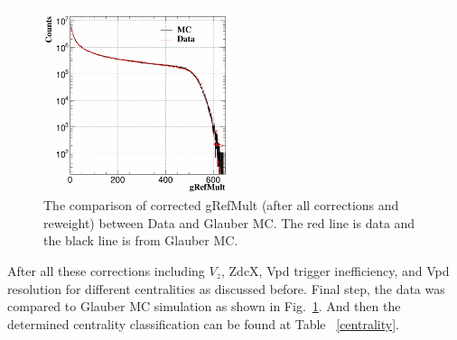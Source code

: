 \documentclass[a4paper]{article}
\begin{document}
\begin{figure}[htbp]
\centering
\includegraphics[keepaspectratio,width=0.5\textwidth]{fig/MB5_AfterALLMCData.png}
\caption{The comparison of corrected gRefMult (after all corrections and reweight) between Data and Glauber MC. The red line is data and the black line is from Glauber MC.\label{fig:MB5_afterAll}}
\end{figure}

After all these corrections including $V_{z}$, ZdcX, Vpd trigger inefficiency, and Vpd resolution for different centralities as discussed before. Final step, the data was compared to Glauber MC simulation as shown in Fig.~\ref{fig:MB5_afterAll}. And then the determined centrality classification can be found at Table ~\ref{centrality}.
\end{document}

